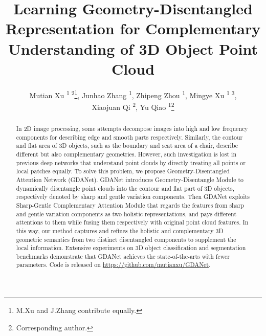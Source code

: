 \documentclass[letterpaper]{article} \usepackage{aaai21}  \usepackage{times}  \usepackage{helvet} \usepackage{courier}  \usepackage[hyphens]{url}  \usepackage{graphicx} \urlstyle{rm} \def\UrlFont{\rm}  \usepackage{natbib}  \usepackage{caption} \frenchspacing  \setlength{\pdfpagewidth}{8.5in}  \setlength{\pdfpageheight}{11in}  \usepackage{color}
\title{Learning Geometry-Disentangled Representation for Complementary Understanding of 3D Object Point Cloud}
\author{
Mutian Xu \textsuperscript{\rm 1 2}\thanks{M.Xu and J.Zhang contribute equally.}, 
	Junhao Zhang \textsuperscript{\rm 1}\footnotemark[1],
	Zhipeng Zhou \textsuperscript{\rm 1},
	Mingye Xu \textsuperscript{\rm 1 3},\\
	Xiaojuan Qi \textsuperscript{\rm 2},
	Yu Qiao \textsuperscript{\rm 1}\thanks{Corresponding author.}\\
}
\begin{document}
\maketitle

\begin{abstract}
In 2D image processing, some attempts decompose images into high and low frequency components for describing edge and smooth parts respectively. Similarly, the contour and flat area of 3D objects, such as the boundary and seat area of a chair, describe different but also complementary geometries. However, such investigation is lost in previous deep networks that understand point clouds by directly treating all points or local patches equally. To solve this problem, we propose Geometry-Disentangled Attention Network (GDANet). GDANet introduces Geometry-Disentangle Module to dynamically disentangle point clouds into the contour and flat part of 3D objects, respectively denoted by sharp and gentle variation components. Then GDANet exploits Sharp-Gentle Complementary Attention Module that regards the features from sharp and gentle variation components as two holistic representations, and pays different attentions to them while fusing them respectively with original point cloud features. In this way, our method captures and refines the holistic and complementary 3D geometric semantics from two distinct disentangled components to supplement the local information. Extensive experiments on 3D object classification and segmentation benchmarks demonstrate that GDANet achieves the state-of-the-arts with fewer parameters. Code is released on \href{https://github.com/mutianxu/GDANet}{https://github.com/mutianxu/GDANet}.
\end{abstract}
\end{document}
